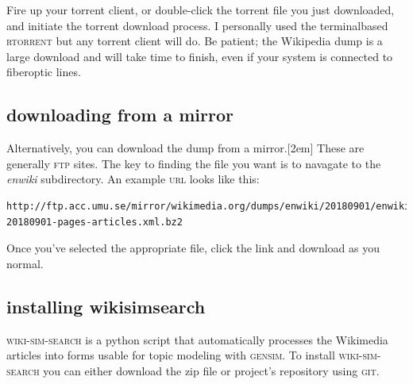 Fire up your torrent client,
 or double-click the torrent file you just
downloaded, and initiate the torrent download process. I personally used the
terminal\textendash based \textsc{rtorrent} but any torrent client will do. Be
patient; the Wikipedia dump is a large download and will take time to finish, even if your system is connected to fiber\textendash optic lines.
\subsection{downloading from a mirror}
Alternatively, you can download the dump from a
mirror.[2em] These are generally \textsc{ftp} sites. The key to finding the file you want is to navagate to the \textit{enwiki} subdirectory.
An example \textsc{url} looks like this:
\begin{lstlisting}
http://ftp.acc.umu.se/mirror/wikimedia.org/dumps/enwiki/20180901/enwiki-20180901-pages-articles.xml.bz2
\end{lstlisting}
Once you've selected the appropriate file, click the link and download as you normal.

\subsection{installing wiki\textendash sim\textendash search} \label{sec:wikisim}
\textsc{wiki-sim-search} is a python script 
that automatically processes the
Wikimedia articles into forms usable for topic modeling with \textsc{gensim}. To
install \textsc{wiki-sim-search} you can either download the zip file or project's
repository using \textsc{git}. 


